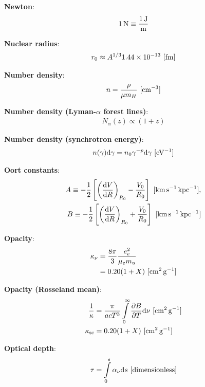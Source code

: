 \documentclass[a4paper,10pt]{article}
\begin{document}
{\noindent}\textbf{Newton}:
\begin{align*}
    {\rm 1\,N \equiv \frac{1\,J}{m}}
\end{align*}

{\noindent}\textbf{Nuclear radius}:
\begin{align*}
    r_0 \approx A^{1/3}1.44\times10^{-13} ~ [{\rm fm}]
\end{align*}

{\noindent}\textbf{Number density}:
\begin{align*}
    n = \frac{\rho}{\mu m_H} ~ [{\rm cm^{-3}}]
\end{align*}

{\noindent}\textbf{Number density (Lyman-$\alpha$ forest lines)}:
\begin{align*}
    N_\alpha(z) \propto (1+z)
\end{align*}

{\noindent}\textbf{Number density (synchrotron energy)}:
\begin{align*}
    n(\gamma){\rm d}\gamma = n_0\gamma^{-p}{\rm d}\gamma ~ [{\rm eV^{-1}}]
\end{align*}

{\noindent}\textbf{Oort constants}:
\begin{align*}
    A \equiv -\frac{1}{2} \left[\left(\frac{{\rm d}V}{{\rm d}R}\right)_{R_0} -\frac{V_0}{R_0}\right] ~ [{\rm km\,s^{-1}\,kpc^{-1}}],\\
    B \equiv -\frac{1}{2} \left[\left(\frac{{\rm d}V}{{\rm d}R}\right)_{R_0} +\frac{V_0}{R_0}\right] ~ [{\rm km\,s^{-1}\,kpc^{-1}}]
\end{align*}

{\noindent}\textbf{Opacity}:
\begin{align*}
    \kappa_\nu &= \frac{8\pi}{3} \frac{e_e^2}{\mu_em_u} \\
    &= 0.20(1+X) ~ [{\rm cm^2\,g^{-1}}]
\end{align*}

{\noindent}\textbf{Opacity (Rosseland mean)}:
\begin{align*} 
    \frac{1}{\kappa} &= \frac{\pi}{acT^3} \int\limits_0^\infty \frac{\partial B}{\partial T} {\rm d}\nu  ~ [{\rm cm^2\,g^{-1}}] \\
    \kappa_{\rm sc} &= 0.20(1+X) ~ [{\rm cm^2\,g^{-1}}]
\end{align*}

{\noindent}\textbf{Optical depth}:
\begin{align*}
    \tau = \int\limits_0^s \alpha_\nu\mathrm{d}s ~ [{\rm dimensionless}]
\end{align*}
\end{document}
